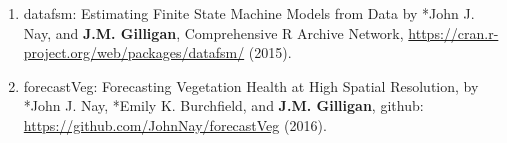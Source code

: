 %
%
\begin{enumerate}
%
    \item 
	datafsm: Estimating Finite State Machine Models from Data
	    by *John J. Nay, and \textbf{J.M. Gilligan}, 
	    Comprehensive R Archive Network, \url{https://cran.r-project.org/web/packages/datafsm/}
        (2015).
%        
    \item 
    forecastVeg: Forecasting Vegetation Health  at High Spatial Resolution,
	    by *John J. Nay, *Emily K. Burchfield, and \textbf{J.M. Gilligan}, 
	    github: \url{https://github.com/JohnNay/forecastVeg}
        (2016).
%        
\end{enumerate}


